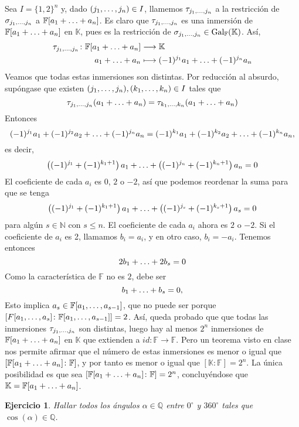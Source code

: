 \documentclass[11pt]{report}
\makeatletter
\renewenvironment{proof}[1][\proofname]{\par
  \pushQED{\qed}%
  \normalfont \topsep\z@skip %
  \trivlist
  \item[\hskip\labelsep
        \itshape
    #1\@addpunct{.}]\ignorespaces
}{%
  \popQED\endtrivlist\@endpefalse
}
\newcommand{\N}{\mathbb N}
\newcommand{\Q}{\mathbb Q}
\newcommand{\F}{\mathbb F}
\newcommand{\K}{\mathbb K}
\newtheorem{ejercicio}{Ejercicio}
\makeatother
\begin{document}
\begin{proof}
Sea $ I = \{1,2\}^{n}$ y, dado $(j_1,\mathellipsis,j_n) \in I$, llamemos $\tau_{j_1,\mathellipsis,j_n}$ a la restricción de $\sigma_{j_1,\mathellipsis,j_n}$ a $\F[a_1+\mathellipsis+a_n]$. Es claro que $\tau_{j_1,\mathellipsis,j_n}$ es una inmersión de $\F[a_1+\mathellipsis+a_n]$ en $\K$, pues es la restricción de $\sigma_{j_1,\mathellipsis,j_n} \in \textup{Gal}_\F(\K)$. Así,
\[
\begin{aligned}[t]
\tau_{j_1,\mathellipsis,j_n} \colon \F[a_1+\mathellipsis+a_n] &\longrightarrow \K \\
a_1+\mathellipsis+a_n &\longmapsto (-1)^{j_1}a_1+\mathellipsis+(-1)^{j_n}a_n
\end{aligned}
\]
Veamos que todas estas inmersiones son distintas. Por reducción al absurdo, supóngase que existen $(j_1,\mathellipsis,j_n) ,(k_1,\mathellipsis,k_n)\in I$ tales que
\[\tau_{j_1,\mathellipsis,j_n}(a_1+\mathellipsis+a_n) =\tau_{k_1,\mathellipsis,k_n}(a_1+\mathellipsis+a_n) \]
Entonces
\[ (-1)^{j_1}a_1+(-1)^{j_2}a_2+\mathellipsis+(-1)^{j_n}a_n = (-1)^{k_1}a_1+(-1)^{k_2}a_2+\mathellipsis+(-1)^{k_n}a_n,\]
es decir,
\[\left((-1)^{j_1}+(-1)^{k_1+1}\right)a_1+\mathellipsis+\left((-1)^{j_n}+(-1)^{k_n+1}\right)a_n = 0\]
El coeficiente de cada $a_i$ es $0$, $2$ o $-2$, así que podemos reordenar la suma para que se tenga
\[\left((-1)^{j_1}+(-1)^{k_1+1}\right)a_1+\mathellipsis+\left((-1)^{j_s}+(-1)^{k_s+1}\right)a_s = 0\]
para algún $s \in \N$ con $s \leq n$. El coeficiente de cada $a_i$ ahora es $2$ o $-2$. Si el coeficiente de $a_i$ es 2, llamamos $b_i = a_i$, y en otro caso, $b_i = -a_i$. Tenemos entonces
\[2b_1+\mathellipsis+2b_s = 0\]
Como la característica de $\F$ no es $2$, debe ser
\[b_1+\mathellipsis+b_s = 0,\]
Esto implica $a_s \in \F[a_1,\mathellipsis,a_{s-1}]$, que no puede ser porque $[F[a_1,\mathellipsis,a_s] \colon \F[a_1,\mathellipsis,a_{s-1}]] =2$.
Así, queda probado que que todas las inmersiones $\tau_{j_1,\mathellipsis,j_n}$ son distintas, luego hay al menos $2^n$ inmersiones de $\F[a_1+\mathellipsis+a_n]$ en $\K$ que extienden a $id \colon \F \to \F$. Pero un teorema visto en clase nos permite afirmar que el número de estas inmersiones es menor o igual que $[\F[a_1+\mathellipsis+a_n] \colon \F]$, y por tanto es menor o igual que $[\K \colon \F] =2^n$. La única posibilidad es que sea $[\F[a_1+\mathellipsis+a_n] \colon \F] = 2^n$, concluyéndose que $\K = \F[a_1+\mathellipsis+a_n]$.
\end{proof}

\begin{ejercicio}
    Hallar todos los ángulos $\alpha \in \Q$ entre $0^\circ$ y $360^\circ$ tales que $\cos(\alpha) \in \Q$.
    \end{ejercicio}
    
\end{document}
